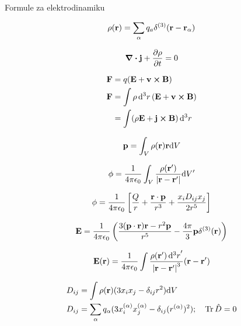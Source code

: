 \documentclass[11pt,twoside]{article}
\date{}
\begin{document}
\thispagestyle{empty}
\begin{center}
Formule za elektrodinamiku
\end{center}
\begin{multicols}{3}

\tiny
\begin{equation}
\rho(\vb{r}) = \sum_\alpha q_a \delta^{(3)}(\vb{r}-\vb{r_\alpha})
\end{equation}

\begin{equation}
\div\vb{j} + \frac{\partial \rho}{\partial t} = 0
\end{equation}

\begin{equation}
\begin{split}
\vb{F} &= q(\vb{E} + \vb{v}\cross\vb{B}) \\
\vb{F} &= \int \rho \dd[3]{r}(\vb{E} + \vb{v}\cross\vb{B}) \\
&= \int (\rho\vb{E} + \vb{j}\cross\vb{B})\dd[3]{r}
\end{split}
\end{equation}

\begin{equation}
\vb{p} = \int_V \rho(\vb{r}) \vb{r} \dd V
\end{equation}

\begin{equation}
\phi = \frac{1}{4 \pi \epsilon_0} \int_V \frac{\rho(\vb{r'})}{|\vb{r}-\vb{r'}|}\dd V'
\end{equation}

\begin{equation}
\phi = \frac{1}{4 \pi \epsilon_0} \left [\frac{Q}{r} + \frac{\vb{r}\cdot\vb{p}}{r^3} + \frac{x_i D_{ij}x_j}{2r^5} \right ]
\end{equation}

\begin{equation}
\vb{E} = \frac{1}{4\pi\epsilon_0} \left(\frac{3(\vb{p}\cdot\vb{r})\vb{r}-r^2\vb{p}}{r^5}-\frac{4\pi}{3}\vb{p}\delta^{(3)}(\vb{r})\right)
\end{equation}

\begin{equation}
\vb{E}(\vb{r}) = \frac{1}{4 \pi \epsilon_0} \int \frac{\rho(\vb{r}')\dd[3]{r}'}{\abs{\vb{r}-\vb{r}'}^3}(\vb{r}-\vb{r}')
\end{equation}

\begin{equation}
\begin{split}
&D_{ij} = \int \rho(\vb{r})(3x_ix_j-\delta_{ij}r^2)\dd V \\
&D_{ij} = \sum_{\alpha} q_{\alpha} ( 3 x_i^{(\alpha)}x_j^{(\alpha)} - \delta_{ij}(r^{(\alpha)})^2); \quad \Tr\hat{D} =0
\end{split}
\end{equation}


\end{multicols}
\end{document}
